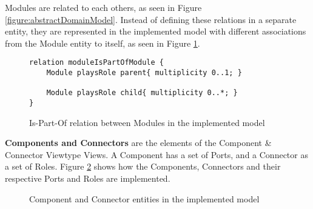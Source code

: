 \documentclass[conference]{IEEEtran}
\begin{document}
Modules are related to each others, as seen in Figure \ref{figure:abstractDomainModel}. Instead of defining these relations in a separate entity, they are represented in the implemented model with different associations from the Module entity to itself, as seen in Figure \ref{figure:modelIsPartOfRelation}.

\begin{figure}
\centering
\lstset{style=customjava}
\begin{lstlisting}
relation moduleIsPartOfModule {
	Module playsRole parent{ multiplicity 0..1; }
	
	Module playsRole child{ multiplicity 0..*; }
}
\end{lstlisting}
\caption{Is-Part-Of relation between Modules in the implemented model}
\label{figure:modelIsPartOfRelation}
\end{figure}

\textbf{Components and Connectors} are the elements of the Component \& Connector Viewtype Views. A Component has a set of Ports, and a Connector as a set of Roles. Figure \ref{figure:modelComponentConnector} shows how the Components, Connectors and their respective Ports and Roles are implemented.
\begin{figure}
\centering
\renewcommand {\umltextcolor}{black}
\renewcommand {\umlfillcolor}{none}
\renewcommand {\umldrawcolor}{black}
\caption{Component and Connector entities in the implemented model}
\label{figure:modelComponentConnector}
\end{figure}
\end{document}
